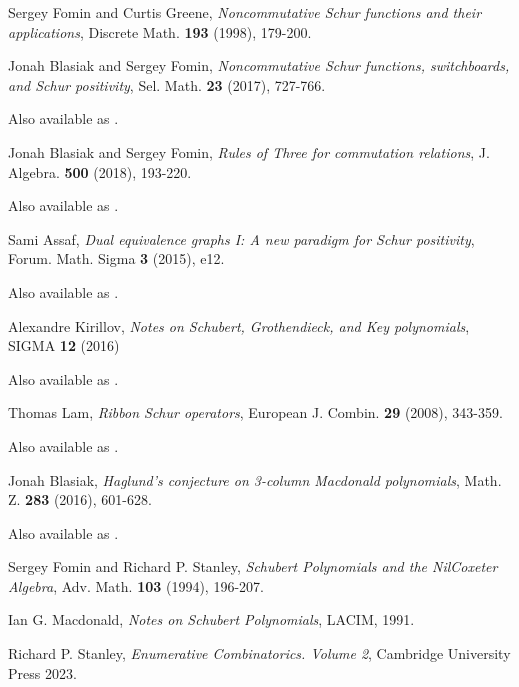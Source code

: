\documentclass{article}
\begin{document}
\begin{thebibliography}{999999}
    \raggedright\footnotesize

    Sergey Fomin and Curtis Greene, 
    \textit{Noncommutative Schur functions and their applications}, 
    Discrete Math. \textbf{193} (1998), 179-200.

    Jonah Blasiak and Sergey Fomin, 
    \textit{Noncommutative Schur functions, switchboards, and Schur positivity},
    Sel. Math. \textbf{23} (2017), 727-766.

    Also available as .

    Jonah Blasiak and Sergey Fomin, 
    \textit{Rules of Three for commutation relations},
    J. Algebra. \textbf{500} (2018), 193-220.

    Also available as .

    Sami Assaf,
    \textit{Dual equivalence graphs I: A new paradigm for Schur positivity},
    Forum. Math. Sigma \textbf{3} (2015), e12.

    Also available as .

    Alexandre Kirillov,
    \textit{Notes on Schubert, Grothendieck, and Key polynomials},
    SIGMA \textbf{12} (2016)

    Also available as .

    Thomas Lam,
    \textit{Ribbon Schur operators},
    European J. Combin. \textbf{29} (2008), 343-359.

    Also available as .

    Jonah Blasiak, 
    \textit{Haglund's conjecture on 3-column Macdonald polynomials},
    Math. Z. \textbf{283} (2016), 601-628.

    Also available as .

    Sergey Fomin and Richard P. Stanley, 
    \textit{Schubert Polynomials and the NilCoxeter Algebra},
    Adv. Math. \textbf{103} (1994), 196-207.

    Ian G. Macdonald, 
    \textit{Notes on Schubert Polynomials}, 
    LACIM, 1991.

    Richard P. Stanley, 
    \textit{Enumerative Combinatorics. Volume 2}, 
    Cambridge University Press 2023.

\end{thebibliography}
\end{document}
